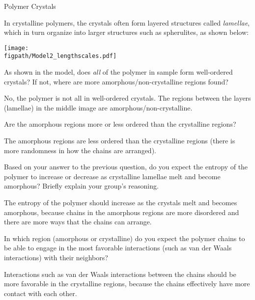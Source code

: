 \begin{activity}{Polymer Crystals}
\begin{model}
	In crystalline polymers, the crystals often form layered structures called \emph{lamellae}, which in turn organize into larger structures such as spherulites, as shown below:
	
	\vspace{6pt}
	\centerline{\texttt{[image: \\figpath/Model2\_lengthscales.pdf]}}
	
\end{model}

\begin{ctqs}

	\question As shown in the model, does \emph{all} of the polymer in sample form well-ordered crystals?  If not, where are more amorphous/non-crystalline regions found?
	
		\begin{solution}[0.75in]{}
			No, the polymer is not all in well-ordered crystals.  The regions between the layers (lamellae) in the middle image are amorphous/non-crystalline.
		\end{solution}
		
	\question Are the amorphous regions more or less ordered than the crystalline regions?
	
		\begin{solution}[0.5in]{}
			The amorphous regions are less ordered than the crystalline regions (there is more randomness in how the chains are arranged).
		\end{solution}
	
	\question Based on your answer to the previous question, do you expect the entropy of the polymer to increase or decrease as crystalline lamellae melt and become amorphous?  Briefly explain your group's reasoning.
	
		\begin{solution}[0.75in]{}
			The entropy of the polymer should increase as the crystals melt and becomes amorphous, because chains in the amorphous regions are more disordered and there are more ways that the chains can arrange.
		\end{solution}
	
	\question In which region (amorphous or crystalline) do you expect the polymer chains to be able to engage in the most favorable interactions (such as van der Waals interactions) with their neighbors?
	
		\begin{solution}[0.75in]{}
			Interactions such as van der Waals interactions between the chains should be more favorable in the crystalline regions, because the chains effectively have more contact with each other.
		\end{solution}
	

\end{ctqs}
\end{activity}
